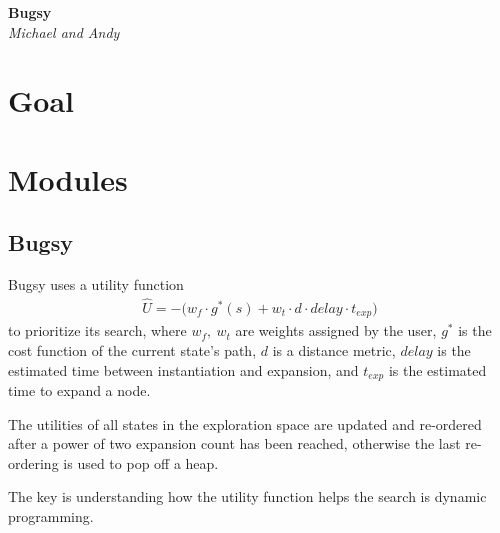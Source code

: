 \documentclass[a4paper]{article}
\begin{document}
\onehalfspacing
\begin{center}
\textbf{Bugsy}\\
\textit{Michael and Andy}\\
\end{center}
\vspace{0.15in}

\section{Goal}
\section{Modules}
\subsection*{Bugsy}

Bugsy uses a utility function \begin{align*}
\hat{U} = -\big( w_f \cdot g^* (s) + w_t \cdot d \cdot delay \cdot t_{exp} \big)
\end{align*}
to prioritize its search, where $w_f, \ w_t$ are weights assigned by the user, $g^*$ is the cost function of the current state's path, $d$ is a distance metric, $delay$ is the estimated time between instantiation and expansion, and $t_{exp}$ is the estimated time to expand a node.

The utilities of all states in the exploration space are updated and re-ordered after a power of two expansion count has been reached, otherwise the last re-ordering is used to pop off a heap.

The key is understanding how the utility function helps the search is dynamic programming. 
\end{document}
